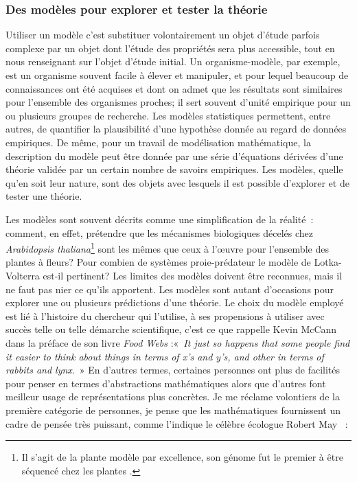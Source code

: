 \subsubsection*{Des modèles pour explorer et tester la
théorie}\label{des-moduxe8les-pour-explorer-et-tester-la-thuxe9orie}

Utiliser un modèle c'est substituer volontairement un objet d'étude
parfois complexe par un objet dont l'étude des propriétés sera plus
accessible, tout en nous renseignant sur l'objet d'étude initial. Un
organisme-modèle, par exemple, est un organisme souvent facile à élever
et manipuler, et pour lequel beaucoup de connaissances ont été acquises
et dont on admet que les résultats sont similaires pour l'ensemble des
organismes proches; il sert souvent d'unité empirique pour un ou
plusieurs groupes de recherche. Les modèles statistiques permettent,
entre autres, de quantifier la plausibilité d'une hypothèse donnée au
regard de données empiriques. De même, pour un travail de modélisation
mathématique, la description du modèle peut être donnée par une série
d'équations dérivées d'une théorie validée par un certain nombre de
savoirs empiriques. Les modèles, quelle qu'en soit leur nature, sont des
objets avec lesquels il est possible d'explorer et de tester une
théorie.

Les modèles sont souvent décrits comme une simplification de la
réalité~: comment, en effet, prétendre que les mécanismes biologiques
décelés chez \emph{Arabidopsis thaliana}\footnote{Il s'agit de la plante
  modèle par excellence, son génome fut le premier à être séquencé chez
  les plantes \citep{TheArabidopsisGenomeInitiative2000}.} sont les
mêmes que ceux à l'œuvre pour l'ensemble des plantes à fleurs? Pour
combien de systèmes proie-prédateur le modèle de Lotka-Volterra est-il
pertinent? Les limites des modèles doivent être reconnues, mais il ne
faut pas nier ce qu'ils apportent. Les modèles sont autant d'occasions
pour explorer une ou plusieurs prédictions d'une théorie. Le choix du
modèle employé est lié à l'histoire du chercheur qui l'utilise, à ses
propensions à utiliser avec succès telle ou telle démarche scientifique,
c'est ce que rappelle Kevin McCann dans la préface de son livre
\emph{Food Webs} \citep{mccann2011food} :«~\emph{It just so happens that
some people find it easier to think about things in terms of x's and
y's, and other in terms of rabbits and lynx}.~» En d'autres termes,
certaines personnes ont plus de facilités pour penser en termes
d'abstractions mathématiques alors que d'autres font meilleur usage de
représentations plus concrètes. Je me réclame volontiers de la première
catégorie de personnes, je pense que les mathématiques fournissent un
cadre de pensée très puissant, comme l'indique le célèbre écologue
Robert May \citep[ p.~791]{May2004}~:

